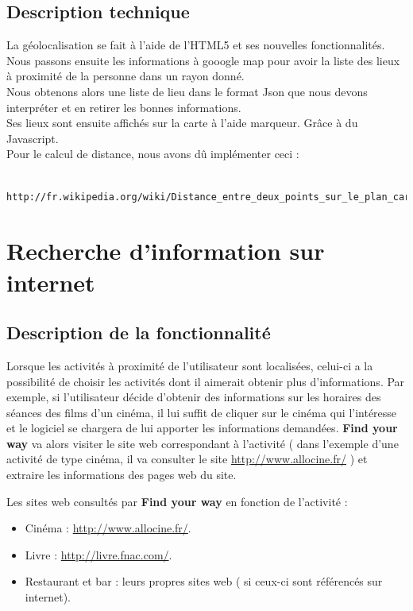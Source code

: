 \documentclass[10pt,a4paper]{report}
\begin{document}
\subsection{Description technique}
\begin{flushleft}
La géolocalisation se fait à l'aide de l'HTML5 et ses nouvelles fonctionnalités. Nous passons ensuite les informations à gooogle map pour avoir la liste des lieux à proximité de la personne dans un rayon donné. \\
Nous obtenons alors une liste de lieu dans le format Json que nous devons interpréter et en retirer les bonnes informations.\\
Ses lieux sont ensuite affichés sur la carte à l'aide marqueur. Grâce à du Javascript. \\

Pour le calcul de distance, nous avons dû implémenter ceci : 
\begin{verbatim}
	http://fr.wikipedia.org/wiki/Distance_entre_deux_points_sur_le_plan_cart%C3%A9sien$ 
\end{verbatim}
\end{flushleft}



\section{Recherche d'information sur internet}

\subsection{Description de la fonctionnalité}
\begin{flushleft}
Lorsque les activités à proximité de l'utilisateur sont localisées, celui-ci a la possibilité de choisir les activités dont il aimerait obtenir plus d'informations.
Par exemple, si l'utilisateur décide d'obtenir des informations sur les horaires des séances des films d'un cinéma, il lui suffit de cliquer sur le cinéma qui l’intéresse et le logiciel se chargera de lui apporter les informations demandées.
\textbf{Find your way} va alors visiter le site web correspondant à l'activité ( dans l'exemple d'une activité de type cinéma, il va consulter le site \url{http://www.allocine.fr/} ) et extraire les informations des pages web du site.\linebreak

Les sites web consultés par \textbf{Find your way} en fonction de l'activité :

\begin{itemize}
\item Cinéma : \url{http://www.allocine.fr/}.

\item Livre : \url{http://livre.fnac.com/}.

\item Restaurant et bar : leurs propres sites web ( si ceux-ci sont référencés sur internet).

\end{itemize}
\end{flushleft}
\end{document}

